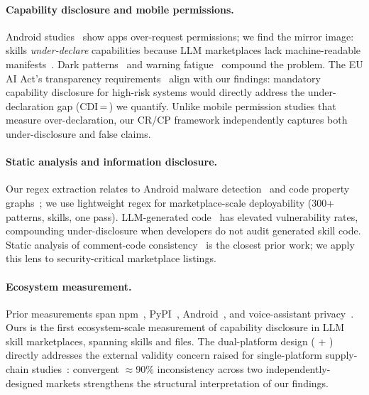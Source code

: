 \paragraph{Capability disclosure and mobile permissions.}
Android studies~\cite{felt2011android,au2012pscout,wijesekera2015android}
show apps over-request permissions; we find the mirror image:
skills {\em under-declare} capabilities because LLM marketplaces
lack machine-readable manifests~\cite{bartel2012static,li2017static}.
Dark patterns~\cite{gray2018dark} and warning fatigue~\cite{bauer2013warning}
compound the problem.
The EU AI Act's transparency requirements~\cite{eu2024aiact} align
with our findings: mandatory capability disclosure for high-risk systems
would directly address the under-declaration gap (CDI\,=\,\ResultCDI{}) we quantify.
Unlike mobile permission studies that measure over-declaration,
our CR/CP framework independently captures both under-disclosure and false claims.

\paragraph{Static analysis and information disclosure.}
Our regex extraction relates to Android malware
detection~\cite{arp2014drebin} and code property
graphs~\cite{yamaguchi2014modeling}; we use lightweight regex
for marketplace-scale deployability (300+ patterns, \NskillsDMR{} skills, one pass).
LLM-generated code~\cite{pearce2022asleep,sandoval2023lost}
has elevated vulnerability rates, compounding under-disclosure
when developers do not audit generated skill code.
Static analysis of comment-code consistency~\cite{tan2007icomment,panthaplackel2020associating}
is the closest prior work; we apply this lens to security-critical marketplace listings.

\paragraph{Ecosystem measurement.}
Prior measurements span npm~\cite{zimmermann2019small},
PyPI~\cite{duan2021measuring}, Android~\cite{felt2011android},
and voice-assistant privacy~\cite{liao2020measuring}.
Ours is the first ecosystem-scale measurement of capability disclosure
in LLM skill marketplaces, spanning \NskillsDMR{} skills and \ResultFilesRead{} files.
The dual-platform design (\clawhub{} + \skillssh{}) directly addresses
the external validity concern raised for single-platform
supply-chain studies~\cite{ladisa2023taxonomy}:
convergent $\approx$90\% inconsistency across two independently-designed
markets strengthens the structural interpretation of our findings.
